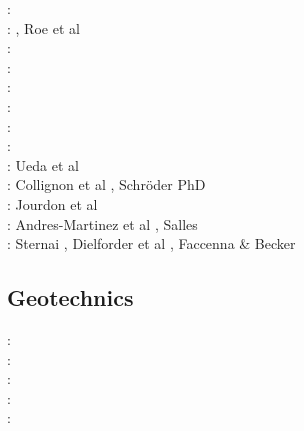 \begin{scriptsize}
\twothousandseven: \cite{buto07}\cite{sebp07}\cite{tomk07}\cite{strw07}\\
\twothousandeight: \cite{alle08}, Roe et al \cite{rowf08}\\
\twothousandnine: \cite{whip09}\cite{kuhe09}\cite{makh09}\cite{pina09}\cite{dala09}\cite{bonn09}\\
\twothousandten: \cite{will10}\cite{tuha10}\cite{brau10}\cite{brau10}\cite{brya10}\cite{crmw10}\\
\twothousandeleven: \cite{robr11}\cite{grhd11}\\
\twothousandtwelve: \cite{kiwh12}\cite{brvv12}\\
\twothousandthirteen: \cite{vehc13}\cite{brwi13}\cite{fihv13a}\cite{fihv13b}\cite{brrs13}\cite{chgz13}\cite{tuva13}
      \cite{caya13} \\
\twothousandfourteen: \cite{crbr14}\cite{cokm14}\cite{erhv14}\cite{erhv15}\cite{stsc14}\cite{olbm14} \\
\twothousandfifteen: Ueda et al \cite{uewg15,fohk15,cofk15}\\
\twothousandsixteen: Collignon et al \cite{coyc16}, Schr{\"o}der PhD \cite{schr16}\\
\twothousandeighteen: Jourdon et al \cite{jolp18}\\
\twothousandnineteen: Andres-Martinez et al \cite{anpa19}, Salles \cite{sall19}\\
\twothousandtwenty: Sternai \cite{ster20}, Dielforder et al \cite{diho20}, Faccenna \& Becker \cite{fabe20}
\end{scriptsize}

\subsection{Geotechnics}

\begin{scriptsize}
\nineteenninetynine: \cite{ster99}\\
\twothousandthree: \cite{gora03}\cite{zhll03}\\
\twothousandfour: \cite{gour04}\\
\twothousandsix: \cite{gork06}\\
\twothousandfourteen: \cite{bufy14}
\end{scriptsize}

